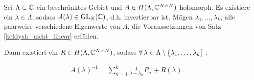 \begin{corollary} \label{keldysh_multi}

    Sei $\Lambda \subset \mathbb{C}$ ein beschränktes Gebiet und $A \in H(\Lambda, \mathbb{C}^{N \times N})$ holomorph.
    Es existiere ein $\lambda \in \Lambda$, sodass $A(\lambda) \in \operatorname{GL}_N(\mathbb{C})$, d.h. invertierbar ist.
    Mögen $\lambda_1, \dots, \lambda_k$, alle paarweise verschiedene Eigenwerte von $A$, die Voraussetzungen von Satz \ref{keldysh_nicht_linear} erfüllen.

    Dann existiert ein $R \in H(\Lambda, \mathbb{C}^{N \times N})$, sodass $\forall \, \lambda \in \Lambda \setminus {\left \{ \lambda_1, \dots, \lambda_k \right \}}:$

    \begin{align*}
        A(\lambda)^{-1}
        =
        \sum_{n=1}^k
            \frac{1}{\lambda - \lambda_n} P_n^+
        +
        R(\lambda).
    \end{align*}

\end{corollary}
